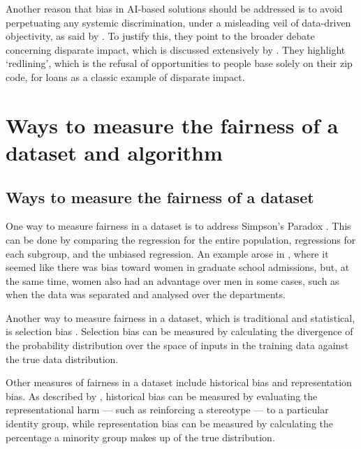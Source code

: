 \documentclass[conference]{IEEEtran}
\begin{document}
Another reason that bias in AI-based solutions should be addressed is to avoid perpetuating any systemic discrimination, under a misleading veil of data-driven objectivity, as said by \cite{d_Alessandro_2017}. To justify this, they point to the broader debate concerning disparate impact, which is discussed extensively by \cite{10.2307/24758720}. They highlight `redlining', which is the refusal of opportunities to people base solely on their zip code, for loans as a classic example of disparate impact.


\section{Ways to measure the fairness of a dataset and algorithm}
\subsection{Ways to measure the fairness of a dataset}
One way to measure fairness in a dataset is to address Simpson's Paradox \cite{10.2307/2284382}. This can be done by comparing the regression for the entire population, regressions for each subgroup, and the unbiased regression. An example arose in \cite{Bickel398}, where it seemed like there was bias toward women in graduate school admissions, but, at the same time, women also had an advantage over men in some cases, such as when the data was separated and analysed over the departments.

Another way to measure fairness in a dataset, which is traditional and statistical, is selection bias \cite{DBLP:journals/corr/abs-1901-10002}. Selection bias can be measured by calculating the divergence of the probability distribution over the space of inputs in the training data against the true data distribution.

Other measures of fairness in a dataset include historical bias and representation bias. As described by \cite{DBLP:journals/corr/abs-1901-10002}, historical bias can be measured by evaluating the representational harm --- such as reinforcing a stereotype --- to a particular identity group, while representation bias can be measured by calculating the percentage a minority group makes up of the true distribution. 
\end{document}

